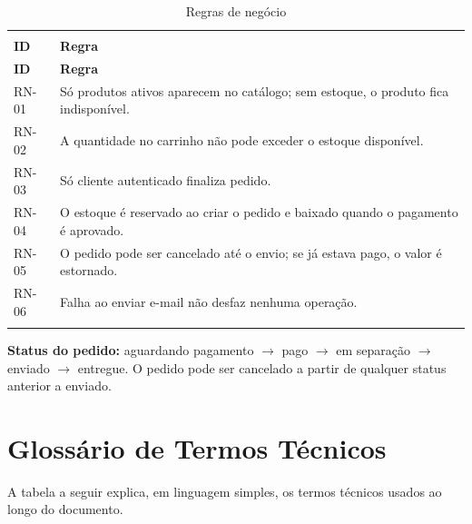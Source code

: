 \documentclass[12pt,a4paper]{article}
\begin{document}
{\setlength{\arrayrulewidth}{0.3pt}\renewcommand{\arraystretch}{1.05}
\begin{xltabular}{\textwidth}{>{\raggedright\arraybackslash}p{1.6cm}|>{\raggedright\arraybackslash}X}
\caption{Regras de negócio}\\
\toprule{}
\textbf{ID} & \textbf{Regra}\\ \midrule{}
\endfirsthead
{}\toprule{}
\textbf{ID} & \textbf{Regra}\\ \midrule{}
\endhead
\endlastfoot
RN-01 & Só produtos ativos aparecem no catálogo; sem estoque, o produto fica indisponível.\\ \hline
RN-02 & A quantidade no carrinho não pode exceder o estoque disponível.\\ \hline
RN-03 & Só cliente autenticado finaliza pedido.\\ \hline
RN-04 & O estoque é reservado ao criar o pedido e baixado quando o pagamento é aprovado.\\ \hline
RN-05 & O pedido pode ser cancelado até o envio; se já estava pago, o valor é estornado.\\ \hline
RN-06 & Falha ao enviar e-mail não desfaz nenhuma operação.\\ \bottomrule
\end{xltabular}}

\noindent\textbf{Status do pedido:} aguardando pagamento $\rightarrow$ pago $\rightarrow$ em separação $\rightarrow$ enviado $\rightarrow$ entregue. O pedido pode ser cancelado a partir de qualquer status anterior a enviado.

\section{Glossário de Termos Técnicos}\label{sec:termos}

A tabela a seguir explica, em linguagem simples, os termos técnicos usados ao longo do documento.
\end{document}
